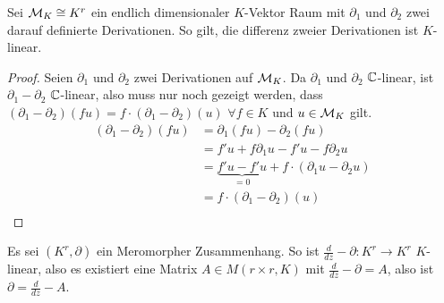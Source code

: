 \begin{lem} Sei $\mathcal{M}_K\cong K^r$ ein endlich dimensionaler $K$-Vektor Raum mit
$\partial_1$ und $\partial_2$ zwei darauf definierte Derivationen. So gilt,
die differenz zweier Derivationen ist $K$-linear.
\end{lem}
\begin{proof}
Seien $\partial_1$ und $\partial_2$ zwei Derivationen auf $\mathcal{M}_K$.
Da $\partial_1$ und $\partial_2$ $\mathbb{C}$-linear, ist $\partial_1-\partial_2$
$\mathbb{C}$-linear, also muss nur noch gezeigt werden, dass
$(\partial_1-\partial_2)(fu)=f\cdot(\partial_1-\partial_2)(u)$ $\forall f\in
K$ und $u\in\mathcal{M}_K$ gilt.\\
\begin{align*}
(\partial_1-\partial_2)(fu) &= \partial_1(fu)-\partial_2(fu)\\
&= f'u+f\partial_1u-f'u-f\partial_2u\\
&= \underset{=0}{\underbrace{f'u-f'u}}+f\cdot(\partial_1u-\partial_2u)\\
&= f\cdot(\partial_1-\partial_2)(u)\\
\end{align*}
\end{proof}
\begin{cor}
Es sei $(K^r,\partial)$ ein Meromorpher Zusammenhang.  So ist
$\frac{d}{dz}-\partial:K^r\rightarrow K^r$ $K$-linear, also es existiert eine
Matrix $A\in M(r\times r,K)$ mit $\frac{d}{dz}-\partial=A$, also ist
$\partial=\frac{d}{dz}-A$.
\end{cor}



